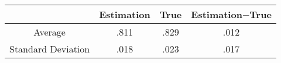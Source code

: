 \begin{tabular}{cccc}
  \toprule
                     & Estimation & True & Estimation$-$True \\
  \midrule
  Average            & .811       & .829 & .012              \\
  Standard Deviation & .018       & .023 & .017              \\
  \bottomrule
\end{tabular}
